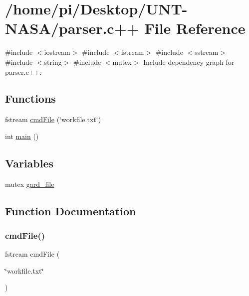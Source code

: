 \hypertarget{parser_8c_09_09}{}\section{/home/pi/\+Desktop/\+U\+N\+T-\/\+N\+A\+S\+A/parser.c++ File Reference}
\label{parser_8c_09_09}
{\ttfamily \#include $<$iostream$>$}\newline
{\ttfamily \#include $<$fstream$>$}\newline
{\ttfamily \#include $<$sstream$>$}\newline
{\ttfamily \#include $<$string$>$}\newline
{\ttfamily \#include $<$mutex$>$}\newline
Include dependency graph for parser.\+c++\+:
\subsection*{Functions}
\begin{DoxyCompactItemize}
\item 
fstream \hyperlink{parser_8c_09_09_ae589633d918ad5abb5d09cf70fcf951f}{cmd\+File} (\char`\"{}workfile.\+txt\char`\"{})
\item 
int \hyperlink{parser_8c_09_09_ae66f6b31b5ad750f1fe042a706a4e3d4}{main} ()
\end{DoxyCompactItemize}
\subsection*{Variables}
\begin{DoxyCompactItemize}
\item 
mutex \hyperlink{parser_8c_09_09_af720f0c5d7682d27ea06535a0408f010}{gard\+\_\+file}
\end{DoxyCompactItemize}


\subsection{Function Documentation}
\mbox{\label{parser_8c_09_09_ae589633d918ad5abb5d09cf70fcf951f}} 
\subsubsection{\texorpdfstring{cmd\+File()}{cmdFile()}}
{\footnotesize\ttfamily fstream cmd\+File (\begin{DoxyParamCaption}\item[{\char`\"{}workfile.\+txt\char`\"{}}]{ }\end{DoxyParamCaption})}

